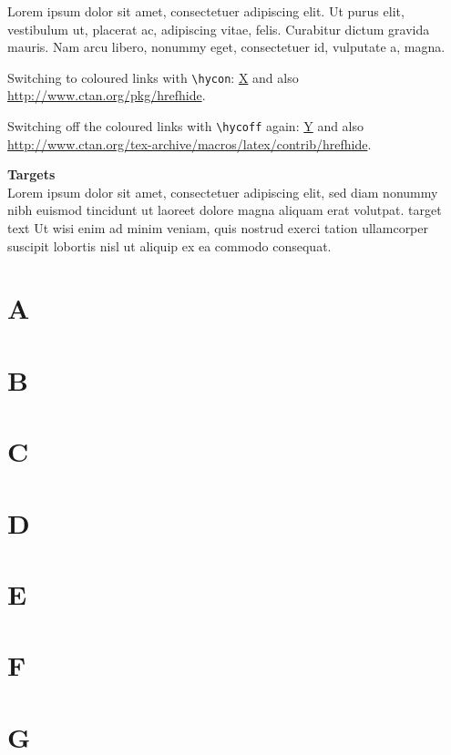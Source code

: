 \documentclass[british]{article}[2007/10/19]%
\begin{document}
Lorem ipsum dolor sit amet, consectetuer adipiscing elit. Ut purus elit,
vestibulum ut, placerat ac, adipiscing vitae, felis. Curabitur dictum gravida
mauris. Nam arcu libero, nonummy eget, consectetuer id, vulputate a,
magna.\newline

Switching to coloured links with \verb|\hycon|:\newline
\hycon
\href{\#RefX}{X} and also
\href{http://www.ctan.org/pkg/hrefhide}{http://www.ctan.org/pkg/hrefhide}.

Switching off the coloured links with \verb|\hycoff| again:\newline
\hycoff
\href{\#RefY}{Y} and also
\href{http://www.ctan.org/tex-archive/macros/latex/contrib/hrefhide}{%
http://www.ctan.org/tex-archive/macros/latex/contrib/hrefhide}.

\pagebreak

{\Large \textbf{Targets}}\\
Lorem ipsum dolor sit amet, consectetuer adipiscing elit, sed diam
nonummy nibh euismod tincidunt ut laoreet dolore magna aliquam erat
volutpat. \hypertarget{target}{target text} Ut wisi enim ad minim
veniam, quis nostrud exerci tation ullamcorper suscipit lobortis
nisl ut aliquip ex ea commodo consequat.

\section[A]{\hypertarget{RefA}{A}} \lipsum[1]
\section[B]{\hypertarget{RefB}{B}} \lipsum[1]
\section[C]{\hypertarget{RefC}{C}} \lipsum[1]
\section[D]{\hypertarget{RefD}{D}} \lipsum[1]
\section[E]{\hypertarget{RefE}{E}} \lipsum[1]
\section[F]{\hypertarget{RefF}{F}} \lipsum[1]
\section[G]{\hypertarget{RefG}{G}} \lipsum[1]
\end{document}
